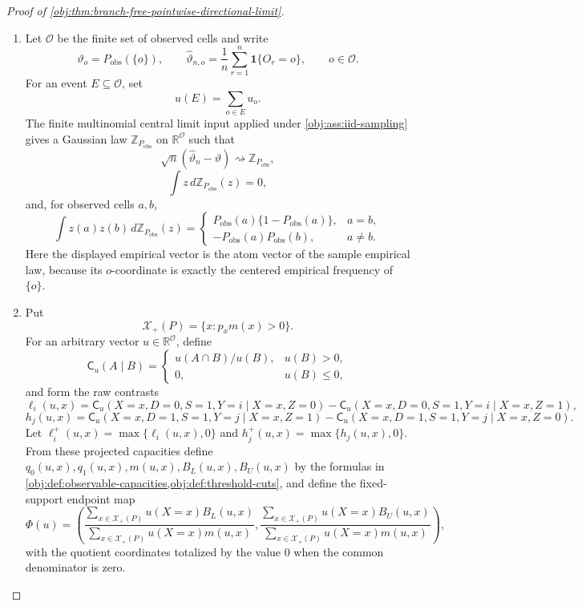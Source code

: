 \documentclass[11pt]{article}
\begin{document}
\begin{proof}[Proof of \cref{obj:thm:branch-free-pointwise-directional-limit}]
\begin{enumerate}
\item Let \(\mathcal O\) be the finite set of observed cells and write
\[
\vartheta_o=P_{\mathrm{obs}}(\{o\}),
\qquad
\widehat\vartheta_{n,o}
=
\frac1n\sum_{r=1}^n\mathbf 1\{O_r=o\},
\qquad o\in\mathcal O .
\]
For an event \(E\subseteq\mathcal O\), set
\[
u(E)=\sum_{o\in E}u_o .
\]
The finite multinomial central limit input applied under \cref{obj:ass:iid-sampling} gives a Gaussian law \(\mathbb Z_{P_{\mathrm{obs}}}\) on \(\mathbb R^{\mathcal O}\) such that
\[
\sqrt n(\widehat\vartheta_n-\vartheta)\rightsquigarrow
\mathbb Z_{P_{\mathrm{obs}}},
\]
\[
\int z\,d\mathbb Z_{P_{\mathrm{obs}}}(z)=0,
\]
and, for observed cells \(a,b\),
\[
\int z(a)z(b)\,d\mathbb Z_{P_{\mathrm{obs}}}(z)
=
\begin{cases}
P_{\mathrm{obs}}(a)\{1-P_{\mathrm{obs}}(a)\},&a=b,\\
-P_{\mathrm{obs}}(a)P_{\mathrm{obs}}(b),&a\ne b.
\end{cases}
\]
Here the displayed empirical vector is the atom vector of the sample empirical law, because its \(o\)-coordinate is exactly the centered empirical frequency of \(\{o\}\). %

\item Put
\[
\mathcal X_+(P)=\{x:p_xm(x)>0\}.
\]
For an arbitrary vector \(u\in\mathbb R^{\mathcal O}\), define
\[
\mathsf C_u(A\mid B)=
\begin{cases}
u(A\cap B)/u(B),&u(B)>0,\\
0,&u(B)\le0,
\end{cases}
\]
and form the raw contrasts
\[
\ell_i(u,x)
=
\mathsf C_u(X=x,D=0,S=1,Y=i\mid X=x,Z=0)
-
\mathsf C_u(X=x,D=0,S=1,Y=i\mid X=x,Z=1),
\]
\[
h_j(u,x)
=
\mathsf C_u(X=x,D=1,S=1,Y=j\mid X=x,Z=1)
-
\mathsf C_u(X=x,D=1,S=1,Y=j\mid X=x,Z=0).
\]
Let \(\ell_i^+(u,x)=\max\{\ell_i(u,x),0\}\) and
\(h_j^+(u,x)=\max\{h_j(u,x),0\}\). From these projected capacities define
\(q_0(u,x),q_1(u,x),m(u,x),B_L(u,x),B_U(u,x)\) by the formulas in
\cref{obj:def:observable-capacities,obj:def:threshold-cuts}, and define the fixed-support endpoint map
\[
\Phi(u)
=
\left(
\frac{\sum_{x\in\mathcal X_+(P)}u(X=x)B_L(u,x)}
{\sum_{x\in\mathcal X_+(P)}u(X=x)m(u,x)},
\frac{\sum_{x\in\mathcal X_+(P)}u(X=x)B_U(u,x)}
{\sum_{x\in\mathcal X_+(P)}u(X=x)m(u,x)}
\right),
\]
with the quotient coordinates totalized by the value \(0\) when the common denominator is zero. %


\end{enumerate}
\end{proof}
\end{document}

